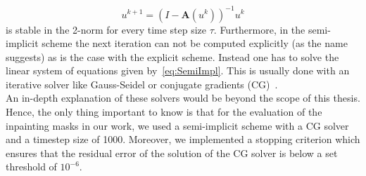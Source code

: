\begin{equation}
    u^{k+1} = {(I- \mathbf{A}(u^k))}^{-1}u^k
\end{equation}
is stable in the 2-norm for every time step size $\tau$.\newpage\noindent
Furthermore, in the semi-implicit scheme the next iteration can not be computed explicitly (as the name
suggests) as is the case with the explicit scheme. Instead one has to solve
the linear system of equations given by~\eqref{eq:SemiImpl}. This is usually done with an iterative
solver like Gauss-Seidel or conjugate gradients (CG)~\cite{conjugateGradients}.\\
An in-depth explanation of these solvers would be beyond the scope of this thesis.
Hence, the only thing important to know is that for the evaluation of the inpainting masks in our work,
we used a semi-implicit scheme with a CG solver and a timestep size of 1000.
Moreover, we implemented a stopping criterion which ensures that the residual error of the solution
of the CG solver is below a set threshold of $10^{-6}$.
